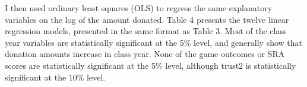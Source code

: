 \documentclass[12pt]{article}
\begin{document}
I then used ordinary least squares (OLS) to regress the same explanatory variables on the log of the amount donated. Table 4 presents the twelve linear regression models, presented in the same format as Table 3. Most of the class year variables are statistically significant at the 5\% level, and generally show that donation amounts increase in class year. None of the game outcomes or SRA scores are statistically significant at the 5\% level, although trust2 is statistically significant at the 10\% level.

\end{document}
